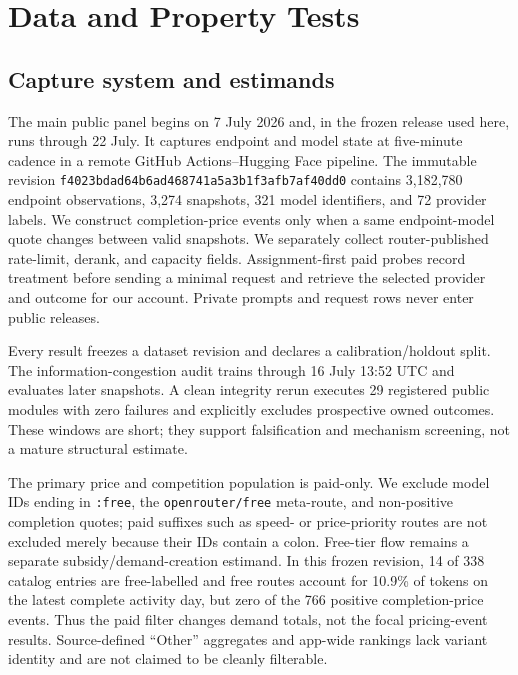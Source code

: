 \documentclass[sigconf,nonacm]{acmart}
\newcommand{\1}{\mathbf 1}
\begin{document}
\section{Data and Property Tests}
\label{sec:data}

\subsection{Capture system and estimands}

The main public panel begins on 7 July 2026 and, in the frozen release used
here, runs through 22 July.  It captures endpoint and model state at five-minute
cadence in a remote GitHub Actions--Hugging Face pipeline.  The immutable
revision \texttt{f4023bdad64b6ad468741a5a3b1f3afb7af40dd0} contains 3,182,780
endpoint observations, 3,274 snapshots, 321 model identifiers, and 72 provider
labels.  We
construct completion-price events only when a same endpoint-model quote changes
between valid snapshots.  We separately collect router-published rate-limit,
derank, and capacity fields.  Assignment-first paid probes record treatment
before sending a minimal request and retrieve the selected provider and outcome
for our account.  Private prompts and request rows never enter public releases.

Every result freezes a dataset revision and declares a calibration/holdout
split.  The information-congestion audit trains through 16 July 13:52 UTC and
evaluates later snapshots.  A clean integrity rerun executes 29 registered
public modules with zero failures and explicitly excludes prospective owned
outcomes.  These windows are short; they support falsification and mechanism
screening, not a mature structural estimate.

The primary price and competition population is paid-only.  We exclude model
IDs ending in \texttt{:free}, the \texttt{openrouter/free} meta-route, and
non-positive completion quotes; paid suffixes such as speed- or price-priority
routes are not excluded merely because their IDs contain a colon.  Free-tier
flow remains a separate subsidy/demand-creation estimand.  In this frozen
revision, 14 of 338 catalog entries are free-labelled and free routes account
for 10.9\% of tokens on the latest complete activity day, but zero of the 766
positive completion-price events.  Thus the paid filter changes demand totals,
not the focal pricing-event results.  Source-defined ``Other'' aggregates and
app-wide rankings lack variant identity and are not claimed to be cleanly
filterable.
\end{document}
